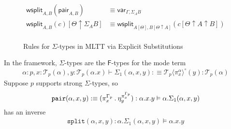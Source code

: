 \documentclass[10pt]{article}
\theoremstyle{definition}
\newcommand{\yields}{\vdash}
\newcommand\TrCirc[2]{\ensuremath{{#1}^\circ(#2)}}
\newcommand\var[1]{\ensuremath{\mathsf{var}_{#1}}}
\newcommand\El[2]{\mathcal{T}_{#1}(#2)}
\newcommand\ApEl[2]{\mathcal{T}_{#1}\langle#2\rangle}
\newcommand\bdot[0]{\mathbin{.}}
\begin{document}
\begin{figure}
\begin{mathpar}
\end{mathpar}
\begin{align}
\mathsf{wsplit}_{A,B}(\mathsf{pair}_{A,B}) &\equiv \var{\Gamma, \Sigma_A B} \\
\mathsf{wsplit}_{A,B}(c)[\Theta \uparrow \Sigma_A B] &\equiv \mathsf{wsplit}_{A[\Theta],B[\Theta \uparrow A]}(c[\Theta \uparrow A \uparrow B]) \\
\end{align}
\caption{Rules for $\Sigma$-types in MLTT via Explicit Substitutions}\label{fig:qit-sigma-rules}
\end{figure}

In the framework, $\Sigma$-types are the $\mathsf{F}$-types for the mode term
\begin{align*}
\alpha : p, x : \El{p}{\alpha}, y : \El{p}{\alpha.x} \yields \Sigma_1(\alpha,x,y) :\equiv \TrCirc{\ApEl{p}{\pi^\alpha_x}}{y} : \El{p}{\alpha}
\end{align*}
Suppose $p$ supports strong $\Sigma$-types, so 
\begin{align*}
\mathtt{pair}(\alpha,x,y) :\equiv (\pi^{\asdep{\Gamma}}_x \bdot \eta^{\pi^{\asdep{\Gamma}}_x}_y) : \alpha.x.y \vDash \alpha.\Sigma_1(\alpha,x,y)
\end{align*}
has an inverse
\begin{align*}
\mathtt{split}(\alpha,x,y) : \alpha.\Sigma_1(\alpha,x,y) \vDash\alpha.x.y
\end{align*}
\end{document}
